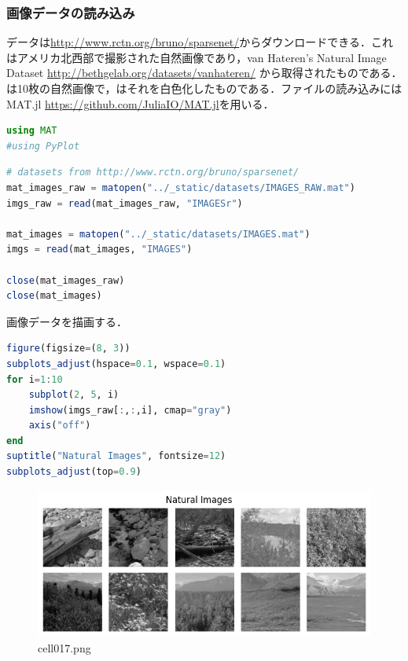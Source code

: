 \subsubsection{画像データの読み込み}
データは\url{http://www.rctn.org/bruno/sparsenet/}からダウンロードできる．これはアメリカ北西部で撮影された自然画像であり，van Hateren's Natural Image Dataset \url{http://bethgelab.org/datasets/vanhateren/} から取得されたものである．は10枚の自然画像で，はそれを白色化したものである．ファイルの読み込みには MAT.jl \url{https://github.com/JuliaIO/MAT.jl}を用いる．
\begin{lstlisting}[language=julia]
using MAT
#using PyPlot
\end{lstlisting}
\begin{lstlisting}[language=julia]
# datasets from http://www.rctn.org/bruno/sparsenet/
mat_images_raw = matopen("../_static/datasets/IMAGES_RAW.mat")
imgs_raw = read(mat_images_raw, "IMAGESr")

mat_images = matopen("../_static/datasets/IMAGES.mat")
imgs = read(mat_images, "IMAGES")

close(mat_images_raw)
close(mat_images)
\end{lstlisting}
画像データを描画する．
\begin{lstlisting}[language=julia]
figure(figsize=(8, 3))
subplots_adjust(hspace=0.1, wspace=0.1)
for i=1:10
    subplot(2, 5, i)
    imshow(imgs_raw[:,:,i], cmap="gray")
    axis("off")
end
suptitle("Natural Images", fontsize=12)
subplots_adjust(top=0.9)  
\end{lstlisting}
\begin{figure}[ht]
	\centering
	\includegraphics[scale=0.8, max width=\linewidth]{./fig/energy-based-model/sparse-coding/cell017.png}
	\caption{cell017.png}
	\label{cell017.png}
\end{figure}
